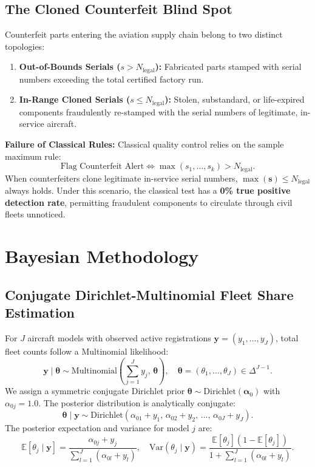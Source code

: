 \documentclass[11pt,a4paper]{article}
\begin{document}
\subsection{The Cloned Counterfeit Blind Spot}
Counterfeit parts entering the aviation supply chain belong to two distinct topologies:
\begin{enumerate}
    \item \textbf{Out-of-Bounds Serials ($s > N_{\text{legal}}$):} Fabricated parts stamped with serial numbers exceeding the total certified factory run.
    \item \textbf{In-Range Cloned Serials ($s \le N_{\text{legal}}$):} Stolen, substandard, or life-expired components fraudulently re-stamped with the serial numbers of legitimate, in-service aircraft.
\end{enumerate}

\textbf{Failure of Classical Rules:} Classical quality control relies on the sample maximum rule:
\begin{equation}
\text{Flag Counterfeit Alert} \iff \max(s_1, \dots, s_k) > N_{\text{legal}}.
\end{equation}
When counterfeiters clone legitimate in-service serial numbers, $\max(\mathbf{s}) \le N_{\text{legal}}$ always holds. Under this scenario, the classical test has a \textbf{0\% true positive detection rate}, permitting fraudulent components to circulate through civil fleets unnoticed.

\section{Bayesian Methodology}

\subsection{Conjugate Dirichlet-Multinomial Fleet Share Estimation}
For $J$ aircraft models with observed active registrations $\mathbf{y} = (y_1, \dots, y_J)$, total fleet counts follow a Multinomial likelihood:
\begin{equation}
\mathbf{y} \mid \boldsymbol{\theta} \sim \text{Multinomial}\left( \sum_{j=1}^J y_j, \, \boldsymbol{\theta} \right), \quad \boldsymbol{\theta} = (\theta_1, \dots, \theta_J) \in \Delta^{J-1}.
\end{equation}
We assign a symmetric conjugate Dirichlet prior $\boldsymbol{\theta} \sim \text{Dirichlet}(\boldsymbol{\alpha}_0)$ with $\alpha_{0j} = 1.0$. The posterior distribution is analytically conjugate:
\begin{equation}
\boldsymbol{\theta} \mid \mathbf{y} \sim \text{Dirichlet}\left( \alpha_{01} + y_1, \, \alpha_{02} + y_2, \, \dots, \, \alpha_{0J} + y_J \right).
\end{equation}
The posterior expectation and variance for model $j$ are:
\begin{equation}
\mathbb{E}[\theta_j \mid \mathbf{y}] = \frac{\alpha_{0j} + y_j}{\sum_{l=1}^J (\alpha_{0l} + y_l)}, \quad \text{Var}(\theta_j \mid \mathbf{y}) = \frac{\mathbb{E}[\theta_j](1 - \mathbb{E}[\theta_j])}{1 + \sum_{l=1}^J (\alpha_{0l} + y_l)}.
\end{equation}
\end{document}
